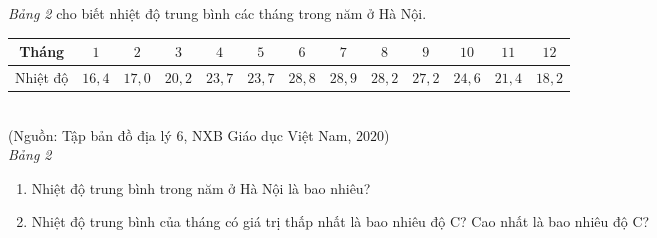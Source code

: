 \begin{bt}%
	\textit{Bảng 2} cho biết nhiệt độ trung bình các tháng trong năm ở Hà Nội.
	\begin{center}
		\begin{tabular}{|c|c|c|c|c|c|c|c|c|c|c|c|c|}
			\hline 
			Tháng	&$1$	&$2$	&$3$	&$4$ &$5$ &$6$ & $7$ &$8$ &$9$& $10$ &$11$ &$12$\\
			\hline 
			Nhiệt độ	&$16{,}4$	&$17{,}0$	&$20{,}2$	&$23{,}7$ &$23{,}7$ &$28{,}8$ &$28{,}9$&$28{,}2$ &$27{,}2$ &$24{,}6$ &$21{,}4$&$18{,}2$ \\
			\hline 
		\end{tabular}\\
		(Nguồn: Tập bản đồ địa lý $6$, NXB Giáo dục Việt Nam, $2020$)\\
		\textit{Bảng 2}
	\end{center}
	\begin{enumerate}
		\item Nhiệt độ trung bình trong năm ở Hà Nội là bao nhiêu?
		\item Nhiệt độ trung bình của tháng có giá trị thấp nhất là bao nhiêu độ C? Cao nhất là bao nhiêu độ C?
	\end{enumerate}
\end{bt}

